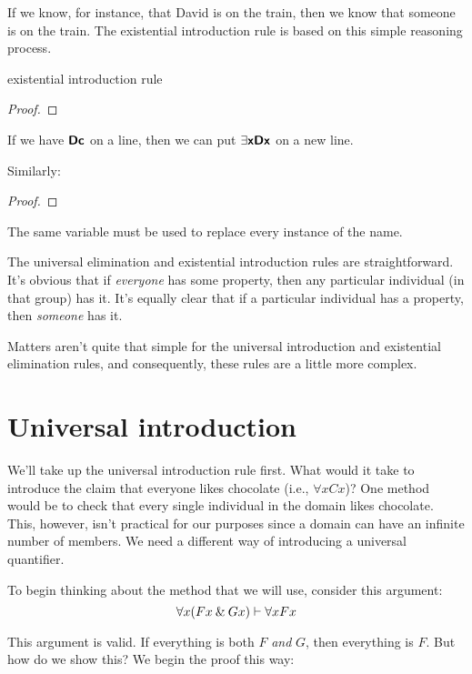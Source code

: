 If we know, for instance, that David is on the train, then we know that someone is on the train. The existential introduction rule is based on this simple reasoning process.

\begin{factboxy}{existential introduction rule}
\begin{proof}
	 
\end{proof}

\small{If we have $\bm{\mathsf{Dc}}$ on a line, then we can put $\exists \bm{\mathsf{x Dx}}$ on a new line.
\smallskip

Similarly:}

\begin{proof}
	 
\end{proof}

\small{The same variable must be used to replace every instance of the name.}

\end{factboxy}

The universal elimination and existential introduction rules are straightforward. It's obvious that if \textit{everyone} has some property, then any particular individual (in that group) has it. It's equally clear that if a particular individual has a property, then \textit{someone} has it.

Matters aren't quite that simple for the universal introduction and existential elimination rules, and consequently, these rules are a little more complex. 


\section{Universal introduction}

We'll take up the universal introduction rule first. What would it take to introduce the claim that everyone likes chocolate (i.e., $\forall x Cx$)? One method would be to check that every single individual in the domain likes chocolate. This, however, isn’t practical for our purposes since a domain can have an infinite number of members.
We need a different way of introducing a universal quantifier.

To begin thinking about the method that we will use, consider this argument:
$$\forall x (Fx \mathbin{\&} Gx) \vdash \forall x Fx$$

\noindent This argument is valid. If everything is both $F$ \emph{and} $G$, then everything is $F$.  But how do we show this?  We begin the proof this way:

